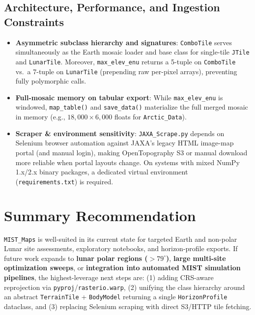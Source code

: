 \documentclass[11pt,letterpaper]{article}
\begin{document}
\subsection{Architecture, Performance, and Ingestion Constraints}
\begin{itemize}
  \item \textbf{Asymmetric subclass hierarchy and signatures}: \texttt{ComboTile} serves simultaneously as the Earth mosaic loader and base class for single-tile \texttt{JTile} and \texttt{LunarTile}. Moreover, \texttt{max\_elev\_enu} returns a 5-tuple on \texttt{ComboTile} vs.\ a 7-tuple on \texttt{LunarTile} (prepending raw per-pixel arrays), preventing fully polymorphic calls.
  \item \textbf{Full-mosaic memory on tabular export}: While \texttt{max\_elev\_enu} is windowed, \texttt{map\_table()} and \texttt{save\_data()} materialize the full merged mosaic in memory (e.g., $18{,}000 \times 6{,}000$ floats for \texttt{Arctic\_Data}).
  \item \textbf{Scraper \& environment sensitivity}: \texttt{JAXA\_Scrape.py} depends on Selenium browser automation against JAXA's legacy HTML image-map portal (and manual login), making OpenTopography S3 or manual download more reliable when portal layouts change. On systems with mixed NumPy 1.x/2.x binary packages, a dedicated virtual environment (\texttt{requirements.txt}) is required.
\end{itemize}

\section{Summary Recommendation}
\texttt{MIST\_Maps} is well-suited in its current state for targeted Earth and non-polar Lunar site assessments, exploratory notebooks, and horizon-profile exports. If future work expands to \textbf{lunar polar regions ($>79^\circ$)}, \textbf{large multi-site optimization sweeps}, or \textbf{integration into automated MIST simulation pipelines}, the highest-leverage next steps are: (1) adding CRS-aware reprojection via \texttt{pyproj}/\texttt{rasterio.warp}, (2) unifying the class hierarchy around an abstract \texttt{TerrainTile} + \texttt{BodyModel} returning a single \texttt{HorizonProfile} dataclass, and (3) replacing Selenium scraping with direct S3/HTTP tile fetching.
\end{document}
